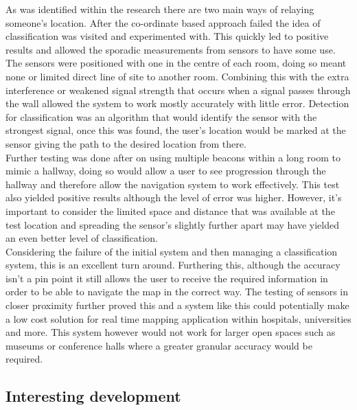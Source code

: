 As was identified within the research there are two main ways of relaying someone's location. After the co-ordinate based approach failed the idea of classification was visited and experimented with. This quickly led to positive results and allowed the sporadic measurements from sensors to have some use. The sensors were positioned with one in the centre of each room, doing so meant none or limited direct line of site to another room. Combining this with the extra interference or weakened signal strength that occurs when a signal passes through the wall allowed the system to work mostly accurately with little error. Detection for classification was an algorithm that would identify the sensor with the strongest signal, once this was found, the user's location would be marked at the sensor giving the path to the desired location from there.\\

Further testing was done after on using multiple beacons within a long room to mimic a hallway, doing so would allow a user to see progression through the hallway and therefore allow the navigation system to work effectively. This test also yielded positive results although the level of error was higher. However, it's important to consider the limited space and distance that was available at the test location and spreading the sensor's slightly further apart may have yielded an even better level of classification.\\

Considering the failure of the initial system and then managing a classification system, this is an excellent turn around. Furthering this, although the accuracy isn't a pin point it still allows the user to receive the required information in order to be able to navigate the map in the correct way. The testing of sensors in closer proximity further proved this and a system like this could potentially make a low cost solution for real time mapping application within hospitals, universities and more. This system however would not work for larger open spaces such as museums or conference halls where a greater granular accuracy would be required.

\subsection{Interesting development}
